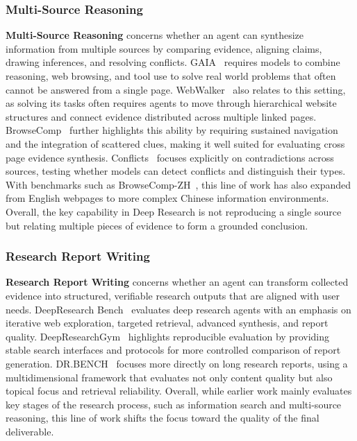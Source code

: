 \subsubsection{Multi-Source Reasoning}
\label{Multi-Source Reasoning}
\textbf{Multi-Source Reasoning} concerns whether an agent can synthesize information from multiple sources by comparing evidence, aligning claims, drawing inferences, and resolving conflicts. GAIA~\cite{GAIA} requires models to combine reasoning, web browsing, and tool use to solve real world problems that often cannot be answered from a single page. 
WebWalker~\cite{WebWalker} also relates to this setting, as solving its tasks often requires agents to move through hierarchical website structures and connect evidence distributed across multiple linked pages. 
BrowseComp~\cite{BrowseComp} further highlights this ability by requiring sustained navigation and the integration of scattered clues, making it well suited for evaluating cross page evidence synthesis. 
Conflicts~\cite{Conflicts} focuses explicitly on contradictions across sources, testing whether models can detect conflicts and distinguish their types. With benchmarks such as BrowseComp-ZH~\cite{BrowseComp-ZH}, this line of work has also expanded from English webpages to more complex Chinese information environments. Overall, the key capability in Deep Research is not reproducing a single source but relating multiple pieces of evidence to form a grounded conclusion.


\subsubsection{Research Report Writing}
\label{Research Report Writing}
\textbf{Research Report Writing} concerns whether an agent can transform collected evidence into structured, verifiable research outputs that are aligned with user needs. DeepResearch Bench~\cite{DeepResearch-Bench} evaluates deep research agents with an emphasis on iterative web exploration, targeted retrieval, advanced synthesis, and report quality. DeepResearchGym~\cite{DeepResearchGym} highlights reproducible evaluation by providing stable search interfaces and protocols for more controlled comparison of report generation. DR.BENCH~\cite{DR_BENCH} focuses more directly on long research reports, using a multidimensional framework that evaluates not only content quality but also topical focus and retrieval reliability. Overall, while earlier work mainly evaluates key stages of the research process, such as information search and multi-source reasoning, this line of work shifts the focus toward the quality of the final deliverable.



